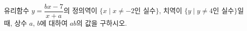 유리함수 $y=\dfrac{bx-7}{x+a}$의 정의역이 $\{x \mid x\ne -2$인 실수$\}$, 치역이 $\{y \mid y\ne 4$인 실수$\}$일 때, 상수 $a$, $b$에 대하여 $ab$의 값을 구하시오.
